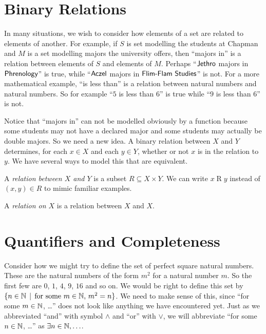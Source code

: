 \section{Binary Relations}

In many situations, we wish to consider how elements of a set are related to elements of another. 
For example, if $S$ is set modelling the students at Chapman and $M$ is a set modelling majors the university offers, then ``majors in'' is a relation between elements of $S$ and elements of $M$.
Perhaps ``${\mathord{\textsf{Jethro}}}$ majors in ${\mathord{\textsf{Phrenology}}}$'' is true, while ``${\mathord{\textsf{Aczel}}}$ majors in ${\mathord{\textsf{Flim-Flam Studies}}}$'' is not. 
For a more mathematical example, ``is less than'' is a relation between natural numbers and natural numbers. So for example ``$5$ is less than $6$'' is true while ``$9$ is less than $6$'' is not.

Notice that ``majors in'' can not be modelled obviously by a function because some students may not have a declared major and some students may actually be double majors. 
So we need a new idea. A binary relation between $X$ and $Y$ determines, for each $x\in X$ and each $y\in Y$, whether or not $x$ is in the relation to $y$. We have several ways to model this that are equivalent.

\begin{defn}
	A \emph{relation between $X$ and $Y$} is a subset $R\subseteq{X\times Y}$. We can write $x\mathrel{R} y$ instead of $(x,y)\in R$ to mimic familiar examples.
	
	A \emph{relation on $X$} is a relation between $X$ and $X$. 
\end{defn}



\section{Quantifiers and Completeness}

Consider how we might try to define the set of perfect square natural numbers.
These are the natural numbers of the form $m^2$ for a natural number $m$.
So the first few are $0$, $1$, $4$, $9$, $16$ and so on.
We would be right to define this set by $\{n\in \mathbb N\,\mid\, \text{for some $m\in\mathbb N$, $m^2=n$}\}$.
We need to make sense of this, since ``for some $m\in \mathbb N$, \ldots'' does not look like anything we have encountered yet.
Just as we abbreviated ``and'' with symbol $\wedge$ and ``or'' with $\vee$, we will abbreviate ``for some $n\in\mathbb N$, \ldots'' as $\exists n\in \mathbb N,\ldots$. 


